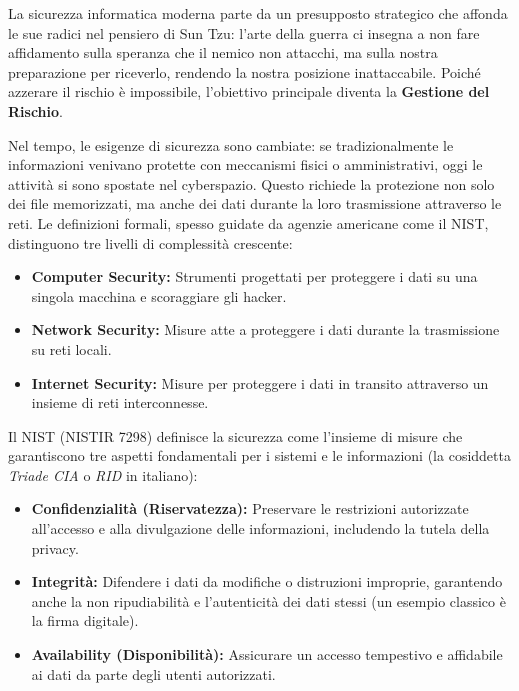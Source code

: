 La sicurezza informatica moderna parte da un presupposto strategico che affonda le sue radici nel pensiero di Sun Tzu: l'arte della guerra ci insegna a non fare affidamento sulla speranza che il nemico non attacchi, ma sulla nostra preparazione per riceverlo, rendendo la nostra posizione inattaccabile. Poiché azzerare il rischio è impossibile, l'obiettivo principale diventa la \textbf{Gestione del Rischio}.

Nel tempo, le esigenze di sicurezza sono cambiate: se tradizionalmente le informazioni venivano protette con meccanismi fisici o amministrativi, oggi le attività si sono spostate nel cyberspazio. Questo richiede la protezione non solo dei file memorizzati, ma anche dei dati durante la loro trasmissione attraverso le reti. Le definizioni formali, spesso guidate da agenzie americane come il NIST, distinguono tre livelli di complessità crescente:

\begin{itemize}
    \item \textbf{Computer Security:} Strumenti progettati per proteggere i dati su una singola macchina e scoraggiare gli hacker.
    \item \textbf{Network Security:} Misure atte a proteggere i dati durante la trasmissione su reti locali.
    \item \textbf{Internet Security:} Misure per proteggere i dati in transito attraverso un insieme di reti interconnesse.
\end{itemize}

Il NIST (NISTIR 7298) definisce la sicurezza come l'insieme di misure che garantiscono tre aspetti fondamentali per i sistemi e le informazioni (la cosiddetta \textit{Triade CIA} o \textit{RID} in italiano):

\begin{itemize}
    \item \textbf{Confidenzialità (Riservatezza):} Preservare le restrizioni autorizzate all'accesso e alla divulgazione delle informazioni, includendo la tutela della privacy.
    \item \textbf{Integrità:} Difendere i dati da modifiche o distruzioni improprie, garantendo anche la non ripudiabilità e l'autenticità dei dati stessi (un esempio classico è la firma digitale).
    \item \textbf{Availability (Disponibilità):} Assicurare un accesso tempestivo e affidabile ai dati da parte degli utenti autorizzati.
\end{itemize}

